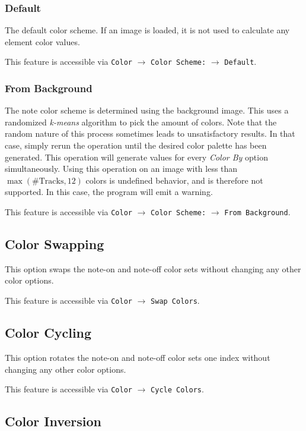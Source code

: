 \documentclass[english]{article}
\providecommand{\mi}[1]{\texttt{#1}}
\begin{document}
\subsubsection{Default}

The default color scheme. If an image is loaded, it is not used to calculate any element color values.

This feature is accessible via 
\mi{Color} $\rightarrow$ \mi{Color Scheme:} $\rightarrow$ \mi{Default}.

\subsubsection{From Background}

The note color scheme is determined using the background image. This uses a randomized \textit{k-means} algorithm
to pick the amount of colors. Note that the random nature of this process sometimes leads to unsatisfactory results.
In that case, simply rerun the operation until the desired color palette has been generated. This operation will
generate values for every \textit{Color By} option simultaneously. Using this operation on an image with less
than $\max(\text{\# Tracks}, 12)$ colors is undefined behavior, and is therefore not supported. In this case,
the program will emit a warning.

This feature is accessible via 
\mi{Color} $\rightarrow$ \mi{Color Scheme:} $\rightarrow$ \mi{From Background}.

\subsection{Color Swapping}

This option swaps the note-on and note-off color sets without changing any other color options.

This feature is accessible via 
\mi{Color} $\rightarrow$ \mi{Swap Colors}.

\subsection{Color Cycling}

This option rotates the note-on and note-off color sets one index without changing any other color options.

This feature is accessible via 
\mi{Color} $\rightarrow$ \mi{Cycle Colors}.

\subsection{Color Inversion}
\end{document}
